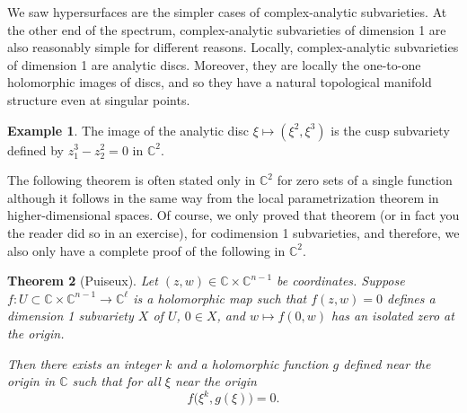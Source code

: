 \documentclass[12pt,openany]{book}
\newcommand{\C}{{\mathbb{C}}}
\newcommand{\myindex}[1]{#1\index{#1}}
\theoremstyle{plain}
\newtheorem{thm}{Theorem}[section]
\theoremstyle{remark}
\theoremstyle{definition}
\theoremstyle{exercise}
\theoremstyle{example}
\newtheorem{example}[thm]{Example}
\begin{document}
\medskip

We saw hypersurfaces are the simpler cases of complex-analytic
subvarieties.  At the other end of the spectrum, complex-analytic
subvarieties of dimension 1 are also reasonably simple for different reasons.
Locally, complex-analytic subvarieties of dimension 1 are analytic discs.
Moreover, they are locally the one-to-one holomorphic images of discs,
and so they have a natural topological manifold structure even at singular
points.

\begin{example}
The image of the analytic disc
$\xi \mapsto (\xi^2,\xi^3)$ is the cusp subvariety
defined by $z_1^3-z_2^2 = 0$ in $\C^2$.
\end{example}


The following theorem is often stated only in $\C^2$ for zero sets of
a single function although it follows in
the same way from the local parametrization theorem in higher-dimensional
spaces.  Of course, we only
proved that theorem (or in fact you the reader did so in an exercise), for
codimension 1 subvarieties, and therefore, we also only have a complete
proof of the following in $\C^2$.

\begin{thm}[\myindex{Puiseux}]
Let $(z,w) \in \C \times \C^{n-1}$ be coordinates.
Suppose $f \colon U \subset \C \times \C^{n-1} \to \C^\ell$
is a holomorphic map such that
$f(z,w) = 0$ defines a dimension 1 subvariety $X$ of $U$,
$0 \in X$,
and $w \mapsto f(0,w)$ has an isolated zero at the origin.

Then there exists an integer $k$ and a holomorphic function $g$ defined near
the origin in $\C$ such that
for all $\xi$ near the origin
\begin{equation*}
f\bigl(\xi^k,g(\xi)\bigr) = 0 .
\end{equation*}
\end{thm}
\end{document}
